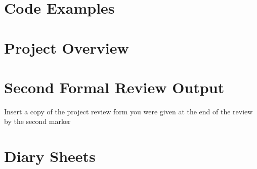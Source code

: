 \begin{appendices}
    \section{Code Examples}

    
    
    
    

    
    
    

    

    
    
    

    \section{Project Overview}

    

    \section{Second Formal Review Output}
    Insert a copy of the project review form you were given at the end of the review by the second marker

    \section{Diary Sheets}

    
    
    
    
    
\end{appendices}
